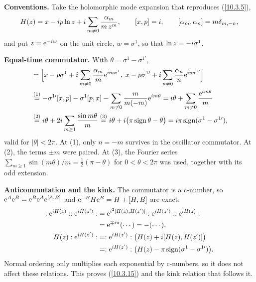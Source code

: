 	\begin{tcolorbox}[breakable]
		\begin{remark}
			\textbf{Conventions.} Take the holomorphic mode expansion that reproduces (\ref{10.3.5}),
			\begin{equation*}
				H(z)=x-i p\ln z+i\sum_{m\neq0}\frac{\alpha_m}{m\,z^{m}},\qquad [x,p]=i,\qquad [\alpha_m,\alpha_n]=m\delta_{m,-n},
			\end{equation*}
			and put $z=\mathrm{e}^{-i w}$ on the unit circle, $w=\sigma^1$, so that $\ln z=-i\sigma^1$.

			\textbf{Equal-time commutator.} With $\theta=\sigma^1-\sigma^{1\prime}$,
			\begin{align*}
				[H(\sigma^1),H(\sigma^{1\prime})]&=\Bigl[x-p\sigma^1+\mi\sum_{m\neq0}\frac{\alpha_m}{m}\me^{\mi m\sigma^1},\;x-p\sigma^{1\prime}+\mi\sum_{n\neq0}\frac{\alpha_n}{n}\me^{\mi n\sigma^{1\prime}}\Bigr]\\
				&\eqs{1}-\sigma^{1\prime}[x,p]-\sigma^1[p,x]-\sum_{m\neq0}\frac{m}{m(-m)}\me^{\mi m\theta}
				=\mi\theta+\sum_{m\neq0}\frac{\me^{\mi m\theta}}{m}\\
				&\eqs{2}\mi\theta+2\mi\sum_{m\ge1}\frac{\sin m\theta}{m}\eqs{3}\mi\theta+\mi\bigl(\pi\,\mathrm{sign}\,\theta-\theta\bigr)=\mi\pi\,\mathrm{sign}(\sigma^1-\sigma^{1\prime}) ,
			\end{align*}
			valid for $|\theta|<2\pi$. At (1), only $n=-m$ survives in the oscillator commutator. At (2), the terms $\pm m$ were paired. At (3), the Fourier series $\sum_{m\ge1}\sin(m\theta)/m=\tfrac12(\pi-\theta)$ for $0<\theta<2\pi$ was used, together with its odd extension.

			\textbf{Anticommutation and the kink.} The commutator is a c-number, so $\mathrm{e}^{A}\mathrm{e}^{B}=\mathrm{e}^{B}\mathrm{e}^{A}\mathrm{e}^{[A,B]}$ and $\mathrm{e}^{-B}H\mathrm{e}^{B}=H+[H,B]$ are exact:
			\begin{align*}
				\mathrel{:}\mathrm{e}^{i H(z)}\mathrel{:}\mathrel{:}\mathrm{e}^{i H(z')}\mathrel{:}&=\mathrm{e}^{i^{2}[H(z),H(z')]}\mathrel{:}\mathrm{e}^{i H(z')}\mathrel{:}\mathrel{:}\mathrm{e}^{i H(z)}\mathrel{:}\\
				&=\mathrm{e}^{\mp i\pi}(\cdots)=-(\cdots),\\
				H(z)\mathrel{:}\mathrm{e}^{i H(z')}\mathrel{:}&=\mathrel{:}\mathrm{e}^{i H(z')}\mathrel{:}\bigl(H(z)+i[H(z),H(z')]\bigr)\\
				&=\mathrel{:}\mathrm{e}^{i H(z')}\mathrel{:}\bigl(H(z)-\pi\,\mathrm{sign}(\sigma^1-\sigma^{1\prime})\bigr) .
			\end{align*}
			Normal ordering only multiplies each exponential by c-numbers, so it does not affect these relations. This proves (\ref{10.3.15}) and the kink relation that follows it.
		\end{remark}
	\end{tcolorbox}
	
